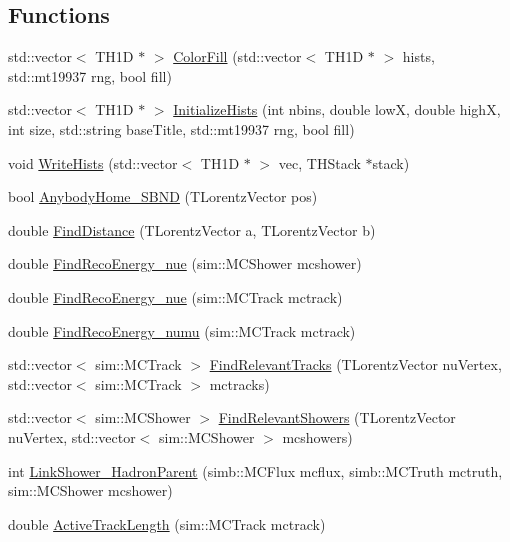 \subsection*{Functions}
\begin{DoxyCompactItemize}
\item 
std::vector$<$ TH1D $\ast$ $>$ \hyperlink{namespaceana_1_1SBNOsc_aa40041630409c79b46793f85659e12ff}{ColorFill} (std::vector$<$ TH1D $\ast$ $>$ hists, std::mt19937 rng, bool fill)
\item 
std::vector$<$ TH1D $\ast$ $>$ \hyperlink{namespaceana_1_1SBNOsc_a9562f13f1927dd6d87f47a116ea88773}{InitializeHists} (int nbins, double lowX, double highX, int size, std::string baseTitle, std::mt19937 rng, bool fill)
\item 
void \hyperlink{namespaceana_1_1SBNOsc_a95cf1192e7bd36e933fbb8333e88391a}{WriteHists} (std::vector$<$ TH1D $\ast$ $>$ vec, THStack $\ast$stack)
\item 
bool \hyperlink{namespaceana_1_1SBNOsc_a7e1f4b48137c1022518fb8eaaf87c5b6}{AnybodyHome\_\-SBND} (TLorentzVector pos)
\item 
double \hyperlink{namespaceana_1_1SBNOsc_a3bcacb7d02055361a967634a2d0a4241}{FindDistance} (TLorentzVector a, TLorentzVector b)
\item 
double \hyperlink{namespaceana_1_1SBNOsc_abec8e35567f2cdc64d5dcff2ecdb84c7}{FindRecoEnergy\_\-nue} (sim::MCShower mcshower)
\item 
double \hyperlink{namespaceana_1_1SBNOsc_ab46ae3a2aa11ce84c3ee5c6a03eccf27}{FindRecoEnergy\_\-nue} (sim::MCTrack mctrack)
\item 
double \hyperlink{namespaceana_1_1SBNOsc_a3f759be55b0fe7e802a69f9282dccdb5}{FindRecoEnergy\_\-numu} (sim::MCTrack mctrack)
\item 
std::vector$<$ sim::MCTrack $>$ \hyperlink{namespaceana_1_1SBNOsc_a06684ac90b7f2450f87b5cebe46e63d3}{FindRelevantTracks} (TLorentzVector nuVertex, std::vector$<$ sim::MCTrack $>$ mctracks)
\item 
std::vector$<$ sim::MCShower $>$ \hyperlink{namespaceana_1_1SBNOsc_a89dd300b266b27181c851bdbbeb1c02f}{FindRelevantShowers} (TLorentzVector nuVertex, std::vector$<$ sim::MCShower $>$ mcshowers)
\item 
int \hyperlink{namespaceana_1_1SBNOsc_a3b92678464aac3671246acd19a96e49a}{LinkShower\_\-HadronParent} (simb::MCFlux mcflux, simb::MCTruth mctruth, sim::MCShower mcshower)
\item 
double \hyperlink{namespaceana_1_1SBNOsc_ac84baa6d3fc6c2bed6b6a28ac055eae4}{ActiveTrackLength} (sim::MCTrack mctrack)

\end{DoxyCompactItemize}
